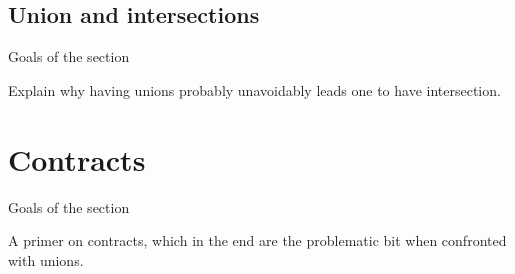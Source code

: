 \documentclass{article}
\begin{document}
\subsection{Union and intersections}
\color{red}Goals of the section

Explain why having unions probably unavoidably leads one to have intersection.\vspace{0.5cm}\color{black}

\section{Contracts}
\color{red}Goals of the section

A primer on contracts, which in the end are the problematic bit when confronted
with unions.\vspace{0.5cm}\color{black}
\end{document}

